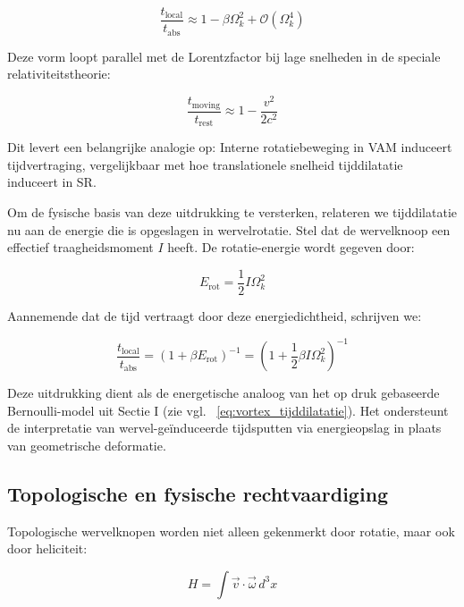 \begin{equation}
\frac{t_\text{local}}{t_\text{abs}} \approx 1 - \beta \Omega_k^2 + \mathcal{O}(\Omega_k^4)\label{eq:rotational_induced_time_dilation_expansion}
\end{equation}

Deze vorm loopt parallel met de Lorentzfactor bij lage snelheden in de speciale relativiteitstheorie:

\begin{equation}
\frac{t_\text{moving}}{t_\text{rest}} \approx 1 - \frac{v^2}{2c^2}\label{eq:parallels_lorentz_time_dilation}
\end{equation}

Dit levert een belangrijke analogie op: Interne rotatiebeweging in VAM induceert tijdvertraging, vergelijkbaar met hoe translationele snelheid tijddilatatie induceert in SR.

Om de fysische basis van deze uitdrukking te versterken, relateren we tijddilatatie nu aan de energie die is opgeslagen in wervelrotatie. Stel dat de wervelknoop een effectief traagheidsmoment $I$ heeft. De rotatie-energie wordt gegeven door:

\begin{equation}
E_\text{rot} = \frac{1}{2} I \Omega_k^2\label{eq:rotational_energy_inertia}
\end{equation}

Aannemende dat de tijd vertraagt door deze energiedichtheid, schrijven we:

\begin{equation}
\frac{t_\text{local}}{t_\text{abs}} = \left(1 + \beta E_\text{rot} \right)^{-1} = \left(1 + \frac{1}{2} \beta I \Omega_k^2 \right)^{-1}\label{eq:time_dilation_rotational_energy_inertia}
\end{equation}

Deze uitdrukking dient als de energetische analoog van het op druk gebaseerde Bernoulli-model uit Sectie I (zie vgl. ~\eqref{eq:vortex_tijddilatatie}). Het ondersteunt de interpretatie van wervel-geïnduceerde tijdsputten via energieopslag in plaats van geometrische deformatie.

\subsection{Topologische en fysische rechtvaardiging}

Topologische wervelknopen worden niet alleen gekenmerkt door rotatie, maar ook door heliciteit:

\begin{equation}
H = \int \vec{v} \cdot \vec{\omega} \, d^3x \label{eq:helicity_rotation}
\end{equation}


